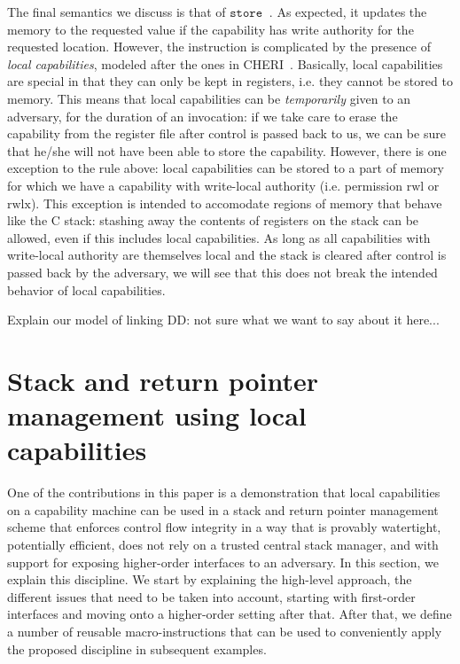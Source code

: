 \documentclass[compsoc,conference,letterpaper,fleqn]{IEEEtran}
\newcommand\dominique[1]{{\color{purple} \sf \footnotesize {DD: #1}}\\}
\newcommand{\zinstr}[1]{\mathtt{#1}}
\newcommand{\twoinstr}[3]{\zinstr{#1} \; #2 \; #3}
\newcommand{\store}[2]{\twoinstr{store}{#1}{#2}}
\newcommand{\plainperm}[1]{\mathrm{#1}}
\newcommand{\readwritel}{\plainperm{rwl}}
\newcommand{\rwl}{\readwritel}
\newcommand{\rwlx}{\plainperm{rwlx}}
\begin{document}
The final semantics we discuss is that of $\store{}{}$. As expected, it updates
the memory to the requested value if the capability has write authority for the
requested location. However, the instruction is complicated by the presence of
\emph{local capabilities}, modeled after the ones in
CHERI~\cite{Watson2015Cheri}. Basically, local capabilities are special in that
they can only be kept in registers, i.e. they cannot be stored to memory. This
means that local capabilities can be \emph{temporarily} given to an adversary,
for the duration of an invocation: if we take care to erase the capability from
the register file after control is passed back to us, we can be sure that he/she
will not have been able to store the capability. However, there is one exception
to the rule above: local capabilities can be stored to a part of memory for
which we have a capability with write-local authority (i.e. permission $\rwl$ or
$\rwlx$). This exception is intended to accomodate regions of memory that behave
like the C stack: stashing away the contents of registers on the stack can be
allowed, even if this includes local capabilities. As long as all capabilities
with write-local authority are themselves local and the stack is cleared after
control is passed back by the adversary, we will see that this does not break
the intended behavior of local capabilities.


Explain our model of linking
\dominique{not sure what we want to say about it here...}

\section{Stack and return pointer management using local capabilities}

One of the contributions in this paper is a demonstration that local
capabilities on a capability machine can be used in a stack and return pointer
management scheme that enforces control flow integrity in a way that is provably
watertight, potentially efficient, does not rely on a trusted central stack
manager, and with support for exposing higher-order interfaces to an adversary.
In this section, we explain this discipline. We start by explaining the
high-level approach, the different issues that need to be taken into account,
starting with first-order interfaces and moving onto a higher-order setting
after that. After that, we define a number of reusable macro-instructions that
can be used to conveniently apply the proposed discipline in subsequent
examples.
\end{document}
